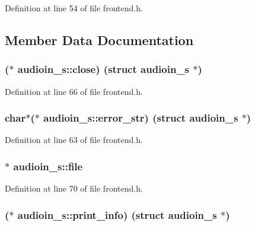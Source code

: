 Definition at line 54 of file frontend.\+h.



\subsection{Member Data Documentation}
\subsubsection[{\texorpdfstring{close}{close}}]{($\ast$ audioin\+\_\+s\+::close) (struct {\bf audioin\+\_\+s} $\ast$)}\hypertarget{structaudioin__s_ac024cfe6c47d65137cad2acc542e4c38}{}\label{structaudioin__s_ac024cfe6c47d65137cad2acc542e4c38}


Definition at line 66 of file frontend.\+h.

\subsubsection[{\texorpdfstring{error\+\_\+str}{error_str}}]{ char$\ast$($\ast$ audioin\+\_\+s\+::error\+\_\+str) (struct {\bf audioin\+\_\+s} $\ast$)}\hypertarget{structaudioin__s_a81096ec686290698e3edb9028df300da}{}\label{structaudioin__s_a81096ec686290698e3edb9028df300da}


Definition at line 63 of file frontend.\+h.

\subsubsection[{\texorpdfstring{file}{file}}]{$\ast$ audioin\+\_\+s\+::file}\hypertarget{structaudioin__s_aa941ab3f8967121ffa7310cc4fb99c2a}{}\label{structaudioin__s_aa941ab3f8967121ffa7310cc4fb99c2a}


Definition at line 70 of file frontend.\+h.

\subsubsection[{\texorpdfstring{print\+\_\+info}{print_info}}]{($\ast$ audioin\+\_\+s\+::print\+\_\+info) (struct {\bf audioin\+\_\+s} $\ast$)}\hypertarget{structaudioin__s_ad7d08417cdbdec93ace36da2b25e48fd}{}\label{structaudioin__s_ad7d08417cdbdec93ace36da2b25e48fd}


